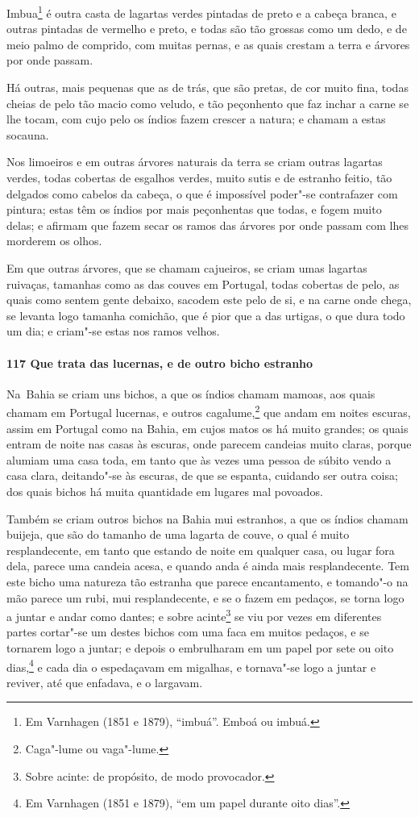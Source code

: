 \begin{linenumbers}
Imbua\footnote{ Em Varnhagen (1851 e 1879), ``imbuá''. Emboá ou imbuá.} é outra casta de
lagartas verdes pintadas de preto e a cabeça branca, e outras pintadas de vermelho e
preto, e todas são tão grossas como um dedo, e de meio palmo de comprido, com muitas
pernas, e as quais crestam a terra e árvores por onde passam.

Há outras, mais pequenas que as de trás, que são pretas, de cor muito fina, todas cheias
de pelo tão macio como veludo, e tão peçonhento que faz inchar a carne se lhe tocam, com
cujo pelo os índios fazem crescer a natura; e chamam a estas socauna.

Nos limoeiros e em outras árvores naturais da terra se criam outras lagartas verdes, todas
cobertas de esgalhos verdes, muito sutis e de estranho feitio, tão delgados como cabelos
da cabeça, o que é impossível poder"-se contrafazer com pintura; estas têm os índios por
mais peçonhentas que todas, e fogem muito delas; e afirmam que fazem secar os ramos das
árvores por onde passam com lhes morderem os olhos.

Em que outras árvores, que se chamam cajueiros, se criam umas lagartas ruivaças, tamanhas
como as das couves em Portugal, todas cobertas de pelo, as quais como sentem gente
debaixo, sacodem este pelo de si, e na carne onde chega, se levanta logo tamanha comichão,
que é pior que a das urtigas, o que dura todo um dia; e criam"-se estas nos ramos velhos.

\paragraph{117 Que trata das lucernas, e de outro bicho estranho}\quad
\mbox{Na Bahia} se criam uns bichos, a que os índios chamam mamoas, aos quais chamam em Portugal
lucernas, e outros cagalume,\footnote{ Caga"-lume ou vaga"-lume.} que andam em noites
escuras, assim em Portugal como na Bahia, em cujos matos os há muito grandes; os quais
entram de noite nas casas às escuras, onde parecem candeias muito claras, porque alumiam
uma casa toda, em tanto que às vezes uma pessoa de súbito vendo a casa clara, deitando"-se
às escuras, de que se espanta, cuidando ser outra coisa; dos quais bichos há muita
quantidade em lugares mal povoados.

Também se criam outros bichos na Bahia mui estranhos, a que os índios chamam buijeja, que
são do tamanho de uma lagarta de couve, o qual é muito resplandecente, em tanto que
estando de noite em qualquer casa, ou lugar fora dela, parece uma candeia acesa, e quando
anda é ainda mais resplandecente. Tem este bicho uma natureza tão estranha que parece
encantamento, e tomando"-o na mão parece um rubi, mui resplandecente, e se o fazem em
pedaços, se torna logo a juntar e andar como dantes; e sobre acinte\footnote{ Sobre
acinte: de propósito, de modo provocador.} se viu por vezes em diferentes partes 
cortar"-se um destes bichos com uma faca em muitos pedaços, e se tornarem logo a
juntar; e depois o embrulharam em um papel por sete ou oito dias,\footnote{ Em Varnhagen
(1851 e 1879), ``em um papel durante oito dias''.} e cada dia o espedaçavam em migalhas, e
tornava"-se logo a juntar e reviver, até que enfadava, e o largavam.


\end{linenumbers}
